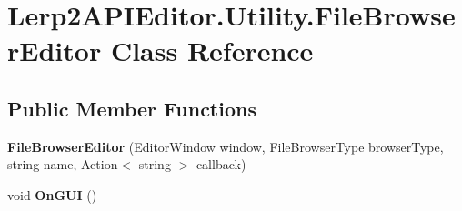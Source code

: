 \hypertarget{class_lerp2_a_p_i_editor_1_1_utility_1_1_file_browser_editor}{}\section{Lerp2\+A\+P\+I\+Editor.\+Utility.\+File\+Browser\+Editor Class Reference}
\label{class_lerp2_a_p_i_editor_1_1_utility_1_1_file_browser_editor}
\subsection*{Public Member Functions}
\begin{DoxyCompactItemize}
\item 
\mbox{\label{class_lerp2_a_p_i_editor_1_1_utility_1_1_file_browser_editor_a8d802048645ebf379b98bed7cf7537df}} 
{\bfseries File\+Browser\+Editor} (Editor\+Window window, File\+Browser\+Type browser\+Type, string name, Action$<$ string $>$ callback)
\item 
\mbox{\label{class_lerp2_a_p_i_editor_1_1_utility_1_1_file_browser_editor_a080b0cafd53b5aa1139d2819ac9647e3}} 
void {\bfseries On\+G\+UI} ()
\end{DoxyCompactItemize}
